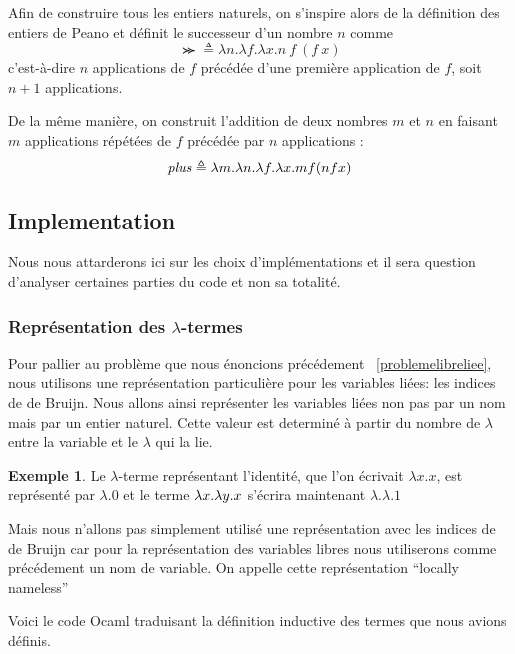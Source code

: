 \documentclass {article}
\newcommand{\codefrom}[3]
           {}
\theoremstyle{definition}
\newtheorem{example}{Exemple}
\theoremstyle{remark}
\begin{document}
Afin de construire tous les entiers naturels, on s'inspire alors de la
définition des entiers de Peano et définit le successeur d'un nombre \(n\)
comme
%
\[
\Succ \triangleq \lambda n. \lambda f. \lambda x. n\: f\: (f\: x)
\]
%
c'est-à-dire \(n\) applications de \(f\) précédée d'une première
application de \(f\), soit \(n+1\) applications.

De la même manière, on construit l'addition de deux nombres \(m\) et
\(n\) en faisant \(m\) applications répétées de \(f\) précédée par
\(n\) applications :
%
\[
\mathit{plus} \triangleq \lambda m. \lambda n. \lambda f. \lambda x. m f (n f x)
\]


\subsection{Implementation}

Nous nous attarderons ici sur les choix d'implémentations et il sera question
d'analyser certaines parties du code et non sa totalité.

\subsubsection{Représentation des $\lambda$-termes}
 
Pour pallier au problème que nous énoncions précédement ~\ref{problemelibreliee}, nous
utilisons une représentation particulière pour les variables liées:
les indices de de Bruijn.  Nous allons ainsi représenter les variables
liées non pas par un nom mais par un entier naturel. Cette valeur est determiné 
à partir du nombre de $\lambda$ entre la variable et le $\lambda$ qui la lie.

\begin{example}
  Le $\lambda$-terme représentant l'identité, que l'on écrivait \(\lambda x.x\), est représenté par \(\lambda.0\)
  et le terme $\lambda x. \lambda y. x$ s'écrira maintenant $\lambda.\lambda.1$ 
\end{example}

Mais nous n'allons pas simplement utilisé une représentation avec les indices de de Bruijn 
car pour la représentation des variables libres nous utiliserons comme précédement un nom
de variable. On appelle cette représentation ``locally nameless'' ~\citep{chargueraud:locally-nameless}

Voici le code Ocaml traduisant la définition inductive des termes que nous avions 
définis.

\codefrom{untyped}{lambda}{untyped_term}
\end{document}
